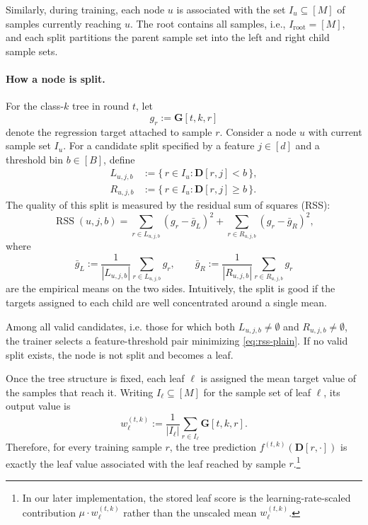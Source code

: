 Similarly, during training, each node $u$ is associated with the set
$I_u\subseteq[M]$ of samples currently reaching $u$. The root contains all
samples, i.e., $I_{\mathrm{root}}=[M]$, and each split partitions the parent
sample set into the left and right child sample sets.

\paragraph{How a node is split.}
For the class-$k$ tree in round $t$, let
\[
g_r := \mathbf{G}[t,k,r]
\]
denote the regression target attached to sample $r$. Consider a node $u$ with
current sample set $I_u$. For a candidate split specified by a feature
$j\in[d]$ and a threshold bin $b\in[B]$, define
\begin{align}
L_{u,j,b} &:= \{\, r\in I_u : \mathbf{D}[r,j] < b \,\},\\
R_{u,j,b} &:= \{\, r\in I_u : \mathbf{D}[r,j] \ge b \,\}.
\end{align}
The quality of this split is measured by the residual sum of squares (RSS):
\begin{equation}\label{eq:rss-plain}
\operatorname{RSS}(u,j,b)
=
\sum_{r\in L_{u,j,b}} (g_r-\bar{g}_L)^2
+
\sum_{r\in R_{u,j,b}} (g_r-\bar{g}_R)^2,
\end{equation}
where
\[
\bar{g}_L := \frac{1}{|L_{u,j,b}|}\sum_{r\in L_{u,j,b}} g_r,
\qquad
\bar{g}_R := \frac{1}{|R_{u,j,b}|}\sum_{r\in R_{u,j,b}} g_r
\]
are the empirical means on the two sides. Intuitively, the split is good if the
targets assigned to each child are well concentrated around a single mean.

Among all valid candidates, i.e. those for which both $L_{u,j,b}\neq\emptyset$ and $R_{u,j,b}\neq\emptyset$, the trainer selects a
feature-threshold pair minimizing \eqref{eq:rss-plain}.
If no valid split exists, the node is not split and becomes a leaf.

Once the tree structure is fixed, each leaf $\ell$ is assigned the mean target
value of the samples that reach it. Writing $I_\ell\subseteq[M]$ for the sample
set of leaf $\ell$, its output value is
\begin{equation}\label{eq:plain-leaf-value}
w_{\ell}^{(t,k)}
:=
\frac{1}{|I_\ell|}\sum_{r\in I_\ell} \mathbf{G}[t,k,r].
\end{equation}
Therefore, for every training sample $r$, the tree prediction
$f^{(t,k)}(\mathbf{D}[r,\cdot])$ is exactly the leaf value associated with the
leaf reached by sample $r$.\footnote{In our later implementation, the stored leaf score is the
learning-rate-scaled contribution $\mu\cdot w_{\ell}^{(t,k)}$ rather than the
unscaled mean $w_{\ell}^{(t,k)}$.}

